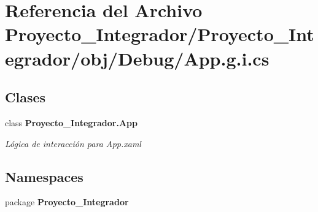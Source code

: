 \section{Referencia del Archivo Proyecto\-\_\-\-Integrador/\-Proyecto\-\_\-\-Integrador/obj/\-Debug/\-App.g.\-i.\-cs}
\label{_app_8g_8i_8cs}
\subsection*{Clases}
\begin{DoxyCompactItemize}
\item 
class {\bf Proyecto\-\_\-\-Integrador.\-App}
\begin{DoxyCompactList}\small\item\em Lógica de interacción para App.\-xaml \end{DoxyCompactList}\end{DoxyCompactItemize}
\subsection*{Namespaces}
\begin{DoxyCompactItemize}
\item 
package {\bf Proyecto\-\_\-\-Integrador}
\end{DoxyCompactItemize}
